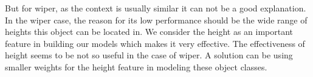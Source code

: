 But for wiper, as the context is usually similar it can not be a good explanation.
In the wiper case, the reason for its low performance should be the wide range of heights this object can be located in.
We consider the height as an important feature in building our models which makes it very effective.
The effectiveness of height seems to be not so useful in the case of wiper.
A solution can be using smaller weights for the height feature in modeling these object classes.

\begin{figure} [htp]
   \begin{center}
     \\

\end{center}
\end{figure}
